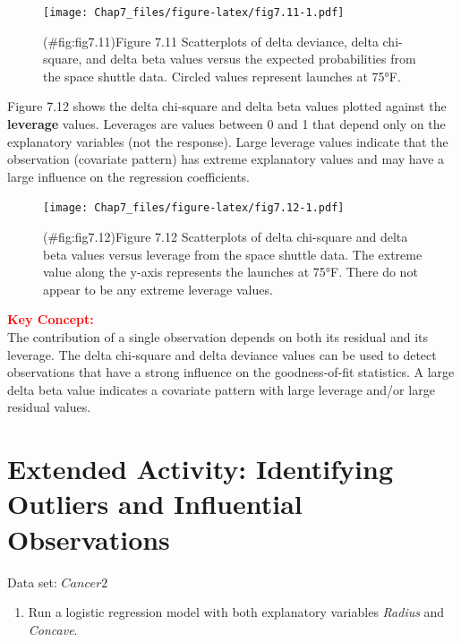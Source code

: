 \documentclass[
]{report}
\providecommand{\tightlist}{%
  \setlength{\itemsep}{0pt}\setlength{\parskip}{0pt}}
\begin{document}
\begin{figure}
\centering
\texttt{[image: Chap7\_files/figure-latex/fig7.11-1.pdf]}
\caption{(\#fig:fig7.11)Figure 7.11 Scatterplots of delta deviance, delta chi-square, and delta beta values versus the expected probabilities from the space shuttle data. Circled values represent launches at 75°F.}
\end{figure}

Figure 7.12 shows the delta chi‐square and delta beta values plotted against the \textbf{leverage} values. Leverages are values between 0 and 1 that depend only on the explanatory variables (not the response). Large leverage values indicate that the observation (covariate pattern) has extreme explanatory values and may have a large influence on the regression coefficients.

\begin{figure}
\centering
\texttt{[image: Chap7\_files/figure-latex/fig7.12-1.pdf]}
\caption{(\#fig:fig7.12)Figure 7.12 Scatterplots of delta chi-square and delta beta values versus leverage from the space shuttle data. The extreme value along the y-axis represents the launches at 75°F. There do not appear to be any extreme leverage values.}
\end{figure}

\large

\textbf{\textcolor{red}{Key Concept:}}\\
\color{red}
The contribution of a single observation depends on both its residual and its leverage. The delta chi‐square and delta deviance values can be used to detect observations that have a strong influence on the goodness‐of‐fit statistics. A large delta beta value indicates a covariate pattern with large leverage and/or large residual values.\\
\color{black}
\normalsize

\section*{Extended Activity: Identifying Outliers and Influential Observations}\label{extended-activity-identifying-outliers-and-influential-observations}

Data set: \(Cancer2\)

\begin{enumerate}
\def\labelenumi{\arabic{enumi}.}
\setcounter{enumi}{32}
\tightlist
\item
  Run a logistic regression model with both explanatory variables \emph{Radius} and \emph{Concave}.\\
\end{enumerate}
\end{document}
